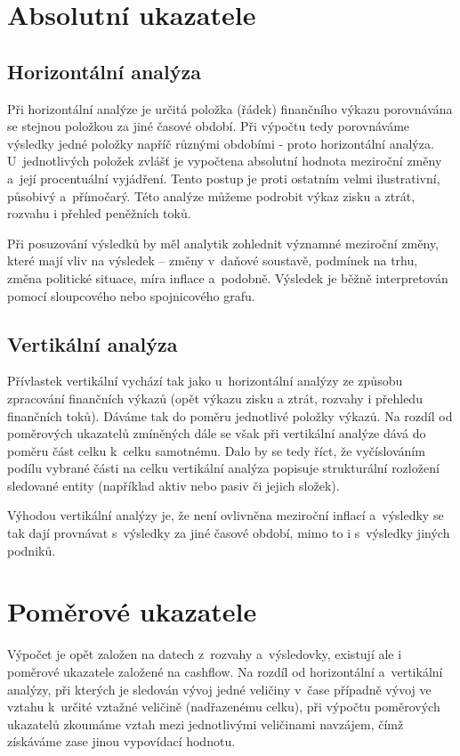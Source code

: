 \section{Absolutní ukazatele}

\subsection{Horizontální analýza}
Při horizontální analýze je určitá položka (řádek) finančního výkazu porovnávána se stejnou položkou za jiné časové období. Při výpočtu tedy porovnáváme výsledky jedné položky napříč různými obdobími - proto horizontální analýza. U~jednotlivých položek zvlášť je vypočtena absolutní hodnota meziroční změny a~její procentuální vyjádření. Tento postup je proti ostatním velmi ilustrativní, působivý a~přímočarý. Této analýze můžeme podrobit výkaz zisku a ztrát, rozvahu i přehled peněžních toků.

Při posuzování výsledků by měl analytik zohlednit významné meziroční změny, které mají vliv na výsledek -- změny v~daňové soustavě, podmínek na trhu, změna politické situace, míra inflace a~podobně. Výsledek je běžně interpretován pomocí sloupcového nebo spojnicového grafu.


\subsection{Vertikální analýza}
Přívlastek vertikální vychází tak jako u~horizontální analýzy ze způsobu zpracování finančních výkazů (opět výkazu zisku a ztrát, rozvahy i přehledu finančních toků). Dáváme tak do poměru jednotlivé položky výkazů. Na rozdíl od poměrových ukazatelů zmíněných dále se však při vertikální analýze dává do poměru část celku k~celku samotnému. Dalo by se tedy říct, že vyčíslováním podílu vybrané části na celku vertikální analýza popisuje strukturální rozložení sledované entity (například aktiv nebo pasiv či jejich složek). 

Výhodou vertikální analýzy je, že není ovlivněna meziroční inflací a~výsledky se tak dají provnávat s~výsledky za jiné časové období, mimo to i s~výsledky jiných podniků.\cite{sedl}






\section{Poměrové ukazatele}
Výpočet je opět založen na datech z~rozvahy a~výsledovky, existují ale i poměrové ukazatele založené na cashflow. Na rozdíl od horizontální a~vertikální analýzy, při kterých je sledován vývoj jedné veličiny v~čase případně vývoj ve vztahu k~určité vztažné veličině (nadřazenému celku), při výpočtu poměrových ukazatelů zkoumáme vztah mezi jednotlivými veličinami navzájem, čímž získáváme zase jinou vypovídací hodnotu.


